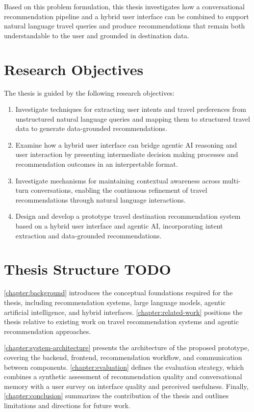 Based on this problem formulation, this thesis investigates how a conversational recommendation pipeline and a hybrid user interface can be combined to support natural language travel queries and produce recommendations that remain both understandable to the user and grounded in destination data.


\section{Research Objectives}\label{section:introduction:research-objectives}
The thesis is guided by the following research objectives:

\begin{enumerate}
  \item Investigate techniques for extracting user intents and travel preferences from unstructured natural language queries and mapping them to structured travel data to generate data-grounded recommendations.
  \item Examine how a hybrid user interface can bridge agentic AI reasoning and user interaction by presenting intermediate decision making processes and recommendation outcomes in an interpretable format.
  \item Investigate mechanisms for maintaining contextual awareness across multi-turn conversations, enabling the continuous refinement of travel recommendations through natural language interactions.
  \item Design and develop a prototype travel destination recommendation system based on a hybrid user interface and agentic AI, incorporating intent extraction and data-grounded recommendations.
\end{enumerate}

\section{Thesis Structure TODO}\label{section:introduction:thesis-structure}
\autoref{chapter:background} introduces the conceptual foundations required for the thesis, including recommendation systems, large language models, agentic artificial intelligence, and hybrid interfaces. \autoref{chapter:related-work} positions the thesis relative to existing work on travel recommendation systems and agentic recommendation approaches.

\autoref{chapter:system-architecture} presents the architecture of the proposed prototype, covering the backend, frontend, recommendation workflow, and communication between components. \autoref{chapter:evaluation} defines the evaluation strategy, which combines a synthetic assessment of recommendation quality and conversational memory with a user survey on interface quality and perceived usefulness. Finally, \autoref{chapter:conclusion} summarizes the contribution of the thesis and outlines limitations and directions for future work.
